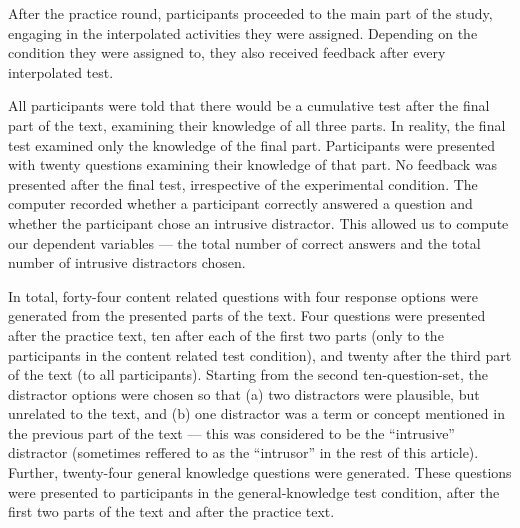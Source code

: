 \documentclass[../main.tex]{subfiles}
\begin{document}
After the practice round, participants proceeded to the main part of the
study, engaging in the interpolated activities they were assigned.
Depending on the condition they were assigned to, they also received
feedback after every interpolated test.

All participants were told that there would be a cumulative test after
the final part of the text, examining their knowledge of all three
parts. In reality, the final test examined only the knowledge of the
final part. Participants were presented with twenty questions examining
their knowledge of that part. No feedback was presented after the final
test, irrespective of the experimental condition. The computer recorded
whether a participant correctly answered a question and whether the
participant chose an intrusive distractor. This allowed us to compute
our dependent variables --- the total number of correct answers and the
total number of intrusive distractors chosen.

In total, forty-four content related questions with four response
options were generated from the presented parts of the text. Four
questions were presented after the practice text, ten after each of the
first two parts (only to the participants in the content related test
condition), and twenty after the third part of the text (to all
participants). Starting from the second ten-question-set, the distractor
options were chosen so that (a) two distractors were plausible, but
unrelated to the text, and (b) one distractor was a term or concept
mentioned in the previous part of the text --- this was considered to be
the ``intrusive'' distractor (sometimes reffered to as the ``intrusor''
in the rest of this article). Further, twenty-four general knowledge
questions were generated. These questions were presented to participants
in the general-knowledge test condition, after the first two parts of
the text and after the practice text.
\end{document}
